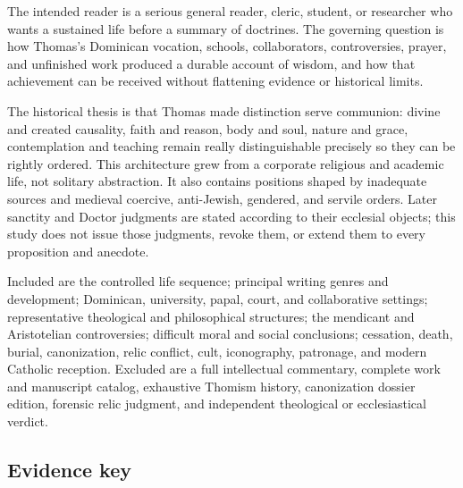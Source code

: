 The intended reader is a serious general reader, cleric, student, or researcher
who wants a sustained life before a summary of doctrines.  The governing
question is how Thomas's Dominican vocation, schools, collaborators,
controversies, prayer, and unfinished work produced a durable account of
wisdom, and how that achievement can be received without flattening evidence
or historical limits.

The historical thesis is that Thomas made distinction serve communion: divine
and created causality, faith and reason, body and soul, nature and grace,
contemplation and teaching remain really distinguishable precisely so they can
be rightly ordered.  This architecture grew from a corporate religious and
academic life, not solitary abstraction.  It also contains positions shaped by
inadequate sources and medieval coercive, anti-Jewish, gendered, and servile
orders.  Later sanctity and Doctor judgments are stated according to their
ecclesial objects; this study does not issue those judgments, revoke them, or
extend them to every proposition and anecdote.

Included are the controlled life sequence; principal writing genres and
development; Dominican, university, papal, court, and collaborative settings;
representative theological and philosophical structures; the mendicant and
Aristotelian controversies; difficult moral and social conclusions;
cessation, death, burial, canonization, relic conflict, cult, iconography,
patronage, and modern Catholic reception.  Excluded are a full intellectual
commentary, complete work and manuscript catalog, exhaustive Thomism history,
canonization dossier edition, forensic relic judgment, and independent
theological or ecclesiastical verdict.

\subsection{Evidence key}

